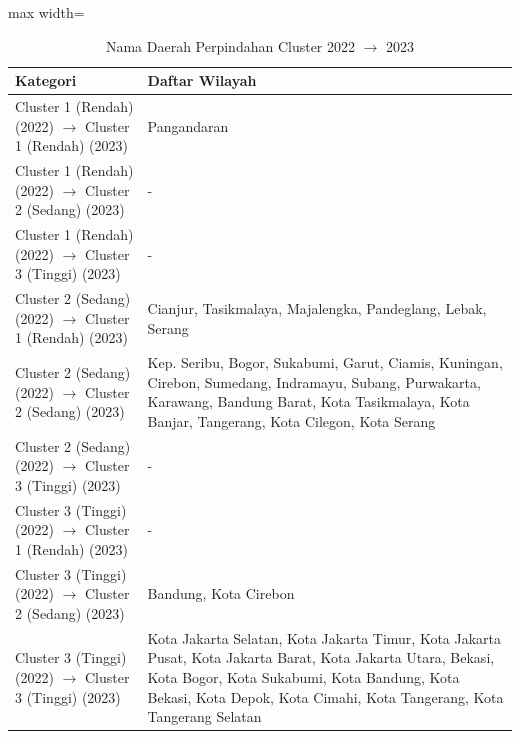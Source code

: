 \begin{table}[H]
\centering
\caption{Nama Daerah Perpindahan Cluster 2022 \(\rightarrow\) 2023} \label{tab:app1transname2022x2023}
\begin{adjustbox}{max width=\textwidth}
\begin{tabular}{|p{4cm}|p{10cm}|}
\hline
\textbf{Kategori} & \textbf{Daftar Wilayah} \\
\hline
Cluster 1 (Rendah) (2022) \(\rightarrow\) Cluster 1 (Rendah) (2023) & Pangandaran \\
\hline
Cluster 1 (Rendah) (2022) \(\rightarrow\) Cluster 2 (Sedang) (2023) & - \\
\hline
Cluster 1 (Rendah) (2022) \(\rightarrow\) Cluster 3 (Tinggi) (2023) & - \\
\hline
Cluster 2 (Sedang) (2022) \(\rightarrow\) Cluster 1 (Rendah) (2023) & Cianjur, Tasikmalaya, Majalengka, Pandeglang, Lebak, Serang \\
\hline
Cluster 2 (Sedang) (2022) \(\rightarrow\) Cluster 2 (Sedang) (2023) & Kep. Seribu, Bogor, Sukabumi, Garut, Ciamis, Kuningan, Cirebon, Sumedang, Indramayu, Subang, Purwakarta, Karawang, Bandung Barat, Kota Tasikmalaya, Kota Banjar, Tangerang, Kota Cilegon, Kota Serang \\
\hline
Cluster 2 (Sedang) (2022) \(\rightarrow\) Cluster 3 (Tinggi) (2023) & - \\
\hline
Cluster 3 (Tinggi) (2022) \(\rightarrow\) Cluster 1 (Rendah) (2023) & - \\
\hline
Cluster 3 (Tinggi) (2022) \(\rightarrow\) Cluster 2 (Sedang) (2023) & Bandung, Kota Cirebon \\
\hline
Cluster 3 (Tinggi) (2022) \(\rightarrow\) Cluster 3 (Tinggi) (2023) & Kota Jakarta Selatan, Kota Jakarta Timur, Kota Jakarta Pusat, Kota Jakarta Barat, Kota Jakarta Utara, Bekasi, Kota Bogor, Kota Sukabumi, Kota Bandung, Kota Bekasi, Kota Depok, Kota Cimahi, Kota Tangerang, Kota Tangerang Selatan \\
\hline
\end{tabular}
\end{adjustbox}
\end{table}